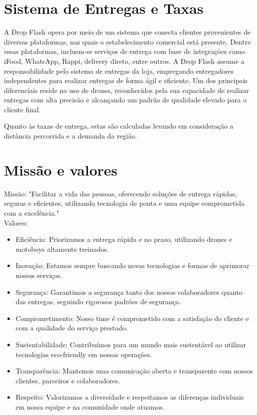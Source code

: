 \section{Sistema de Entregas e Taxas}
 A Drop Flash opera por meio de um sistema que conecta clientes provenientes de diversas plataformas, nas quais o estabelecimento comercial está presente. Dentre essas plataformas, incluem-se serviços de entrega com base de integrações como iFood, WhatsApp, Rappi, delivery direto, entre outros. A Drop Flash assume a responsabilidade pelo sistema de entregas da loja, empregando entregadores independentes para realizar entregas de forma ágil e eficiente. Um dos principais diferenciais reside no uso de drones, reconhecidos pela sua capacidade de realizar entregas com alta precisão e alcançando um padrão de qualidade elevado para o cliente final.

Quanto às taxas de entrega, estas são calculadas levando em consideração a distância percorrida e a demanda da região.

\section{Missão e valores}

Missão: "Facilitar a vida das pessoas, oferecendo soluções de entrega rápidas, seguras e eficientes, utilizando tecnologia de ponta e uma equipe comprometida com a excelência."\\

Valores:
 \begin{itemize}
     \item Eficiência: Priorizamos a entrega rápida e no prazo, utilizando drones e motoboys altamente treinados.
     \item Inovação: Estamos sempre buscando novas tecnologias e formas de aprimorar nossos serviços.
     \item Segurança: Garantimos a segurança tanto dos nossos colaboradores quanto das entregas, seguindo rigorosos padrões de segurança.
     \item Comprometimento: Nosso time é comprometido com a satisfação do cliente e com a qualidade do serviço prestado.
     \item Sustentabilidade: Contribuímos para um mundo mais sustentável ao utilizar tecnologias eco-friendly em nossas operações.
     \item Transparência: Mantemos uma comunicação aberta e transparente com nossos clientes, parceiros e colaboradores.
     \item Respeito: Valorizamos a diversidade e respeitamos as diferenças individuais em nossa equipe e na comunidade onde atuamos.
 \end{itemize}